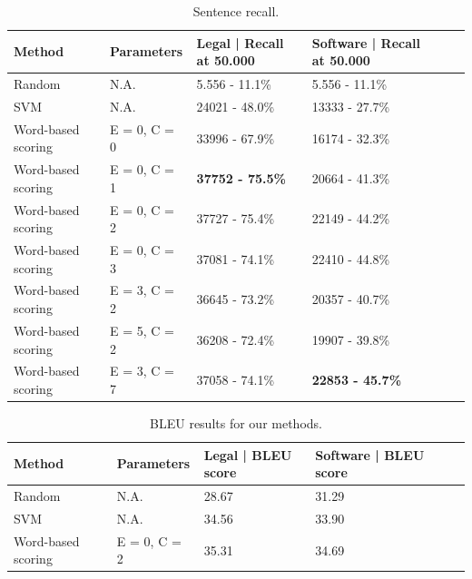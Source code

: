 \documentclass[11pt]{article}
\begin{document}
\begin{table}[t]
    \begin{tabular}{|l|l|l|l|l|l|}
    \hline
    Method & Parameters & Legal | Recall at 50.000  & Software | Recall at 50.000 \\ \hline
    Random      & N.A. & 5.556 - 11.1\%  & 5.556 - 11.1\%     \\ \hline
    SVM      & N.A.          & 24021 - 48.0\%  & 13333 - 27.7\%        \\ \hline
    Word-based scoring  & E = 0, C = 0 & 33996 - 67.9\%  & 16174 - 32.3\%        \\ \hline
    Word-based scoring  & E = 0, C = 1 & \textbf{37752 - 75.5\%}  & 20664 - 41.3\%        \\ \hline
    Word-based scoring  & E = 0, C = 2 & 37727 - 75.4\%  & 22149 - 44.2\%        \\ \hline
    Word-based scoring  & E = 0, C = 3 & 37081 - 74.1\%  & 22410 - 44.8\%        \\ \hline
    Word-based scoring  & E = 3, C = 2 & 36645 - 73.2\%  & 20357 - 40.7\%        \\ \hline
    Word-based scoring  & E = 5, C = 2 & 36208 - 72.4\%  & 19907 - 39.8\%        \\ \hline
    Word-based scoring  & E = 3, C = 7 & 37058 - 74.1\%  & \textbf{22853 - 45.7\%}        \\ \hline
    \end{tabular}
    \caption{Sentence recall.}
   \label{t:t1}
\end{table}
\begin{table}[t]
    \begin{tabular}{|l|l|l|l|l|l|}
    \hline
    Method  & Parameters & Legal | BLEU score  & Software | BLEU score \\ \hline
    Random & N.A. & 28.67  & 31.29       \\ \hline
    SVM & N.A. & 34.56  & 33.90        \\ \hline
    Word-based scoring  & E = 0, C = 2 & 35.31  & 34.69       \\ \hline
    \end{tabular}
    \caption{BLEU results for our methods.}
\label{t:t2}
\end{table}
\end{document}
